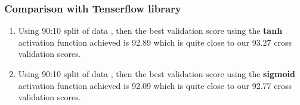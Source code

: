 \documentclass[12pt,t]{beamer}
\begin{document}
\begin{frame}
    \frametitle{Comparison with Tenserflow library}
    \begin{enumerate}
        \item Using 90:10 split of data , then the best validation score using the \textbf{tanh} activation function 
                achieved is 92.89 which is quite close to our 93.27 cross validation scores.
        \item Using 90:10 split of data , then the best validation score using the \textbf{sigmoid} activation function 
        achieved is 92.09 which is quite close to our 92.77 cross validation scores.
    \end{enumerate}
\end{frame}


\end{document}
